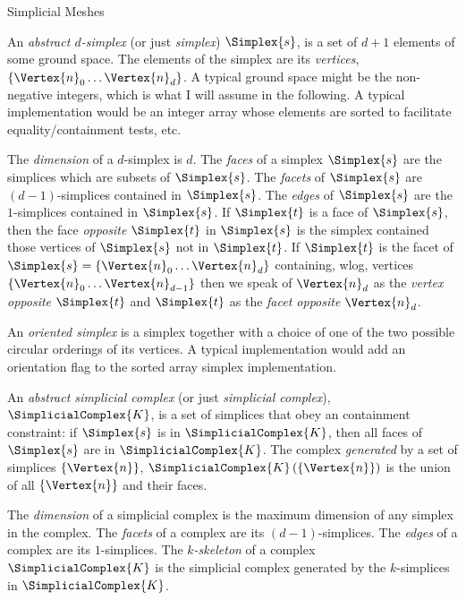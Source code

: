 \begin{plSection}{Simplicial Meshes}
\label{sec:simplicial-meshes}

An {\it abstract $d$-simplex} (or just {\it simplex})
$\Simplex{s}$, is a set of $d+1$ elements of some ground space.
The elements of the simplex are its {\it vertices}, 
$\{ \Vertex{n}_0 \ldots \Vertex{n}_d \}$.
A typical ground space might be the non-negative integers,
which is what I will assume in the following.
A typical implementation would be an integer array
whose elements are sorted to facilitate equality/containment tests, etc.

The {\it dimension} of a $d$-simplex is $d$.
The {\it faces} of a simplex $\Simplex{s}$ are the simplices which are subsets of $\Simplex{s}$.
The {\it facets} of $\Simplex{s}$ are $(d-1)$-simplices contained in $\Simplex{s}$.
The {\it edges} of $\Simplex{s}$ are the $1$-simplices contained in $\Simplex{s}$.
If $\Simplex{t}$ is a face of $\Simplex{s}$,
then the face {\it opposite} $\Simplex{t}$ in $\Simplex{s}$
is the simplex contained those vertices of $\Simplex{s}$
not in $\Simplex{t}$.
If $\Simplex{t}$ is the facet of $\Simplex{s} = \{ \Vertex{n}_0 \ldots \Vertex{n}_d \}$
containing, wlog, vertices $\{ \Vertex{n}_0 \ldots \Vertex{n}_{d-1} \}$
then we speak of $\Vertex{n}_d$ as the {\it vertex opposite} $\Simplex{t}$
and $\Simplex{t}$ as the {\it facet opposite} $\Vertex{n}_d$.

An {\it oriented simplex} is a simplex together with a choice
of one of the two possible circular orderings of its vertices.
A typical implementation would add an orientation flag
to the sorted array simplex implementation.

An {\it abstract simplicial complex} (or just {\it simplicial complex}),
$\SimplicialComplex{K}$, is a set of simplices
that obey an containment constraint:
if $\Simplex{s}$ is in $\SimplicialComplex{K}$, 
then all faces of $\Simplex{s}$ are in $\SimplicialComplex{K}$.
The complex {\it generated} by a set of simplices $\{ \Vertex{n} \}$,
$\SimplicialComplex{K} \left( \{ \Vertex{n} \} \right)$ 
is the union of all $\{ \Vertex{n} \}$
and their faces.

The {\it dimension} of a simplicial complex is the maximum dimension
of any simplex in the complex.
The {\it facets} of a complex are its $(d-1)$-simplices.
The {\it edges} of a complex are its $1$-simplices.
The {\it $k$-skeleton} of a complex $\SimplicialComplex{K}$
is the simplicial complex generated by the $k$-simplices in $\SimplicialComplex{K}$.


\end{plSection}

